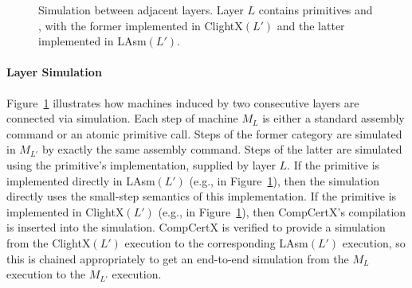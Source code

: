 \begin{figure}
\caption{\small{Simulation between adjacent layers.
Layer $L$ contains primitives  and ,
with the former implemented in ClightX$(L')$ and the latter
implemented in LAsm$(L')$.}}
\label{layer-sim}
\end{figure}

\paragraph{Layer Simulation}
Figure~\ref{layer-sim} illustrates how machines induced by two 
consecutive layers are connected via simulation. Each step 
of machine $M_L$ is either a standard assembly command
or an atomic primitive call. Steps of the former category are
simulated in $M_{L'}$ by exactly the same assembly command.
Steps of the latter are simulated using the primitive's 
implementation, supplied by layer $L$. If the primitive is
implemented directly in LAsm$(L')$ (e.g.,  in Figure~\ref{layer-sim}), 
then the simulation directly 
uses the small-step semantics of this implementation. If the primitive is
implemented in ClightX$(L')$ (e.g.,  in Figure~\ref{layer-sim}), 
then CompCertX's compilation is inserted into the simulation. CompCertX is
verified to provide a simulation from the ClightX$(L')$
execution to the corresponding LAsm$(L')$ execution, so 
this is chained appropriately to get an end-to-end
simulation from the $M_L$ execution to the $M_{L'}$
execution.

